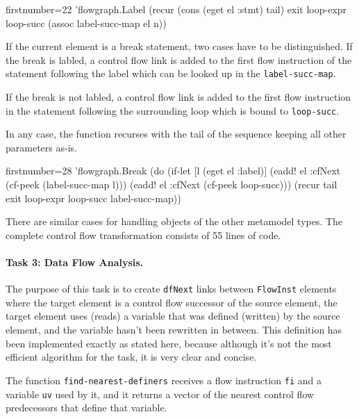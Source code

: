 \documentclass[submission]{eptcs}
\begin{document}
\begin{clojurecode*}{firstnumber=22}
        'flowgraph.Label (recur (cons (eget el :stmt) tail) exit loop-expr loop-succ
                                (assoc label-succ-map el n))
\end{clojurecode*}

If the current element is a break statement, two cases have to be
distinguished.  If the break is labled, a control flow link is added to the
first flow instruction of the statement following the label which can be looked
up in the \verb|label-succ-map|.

If the break is not labled, a control flow link is added to the first flow
instruction in the statement following the surrounding loop which is bound to
\verb|loop-succ|.

In any case, the function recurses with the tail of the sequence keeping all
other parameters as-is.

\begin{clojurecode*}{firstnumber=28}
        'flowgraph.Break (do (if-let [l (eget el :label)]
                               (eadd! el :cfNext (cf-peek (label-succ-map l)))
                               (eadd! el :cfNext (cf-peek loop-succ)))
                           (recur tail exit loop-expr loop-succ label-succ-map))
\end{clojurecode*}

There are similar cases for handling objects of the other metamodel types.  The
complete control flow transformation consists of 55 lines of code.


\paragraph{Task 3: Data Flow Analysis.}
\label{sec:task-3}

The purpose of this task is to create \verb|dfNext| links between
\verb|FlowInst| elements where the target element is a control flow successor
of the source element, the target element uses (reads) a variable that was
defined (written) by the source element, and the variable hasn't been rewritten
in between.  This definition has been implemented exactly as stated here,
because although it's not the most efficient algorithm for the task, it is very
clear and concise.

The function \verb|find-nearest-definers| receives a flow instruction \verb|fi|
and a variable \verb|uv| used by it, and it returns a vector of the nearest
control flow predecessors that define that variable.
\end{document}
